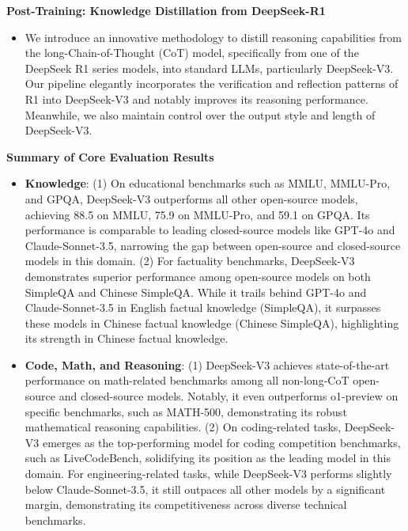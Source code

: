 \documentclass[11pt, a4paper, logo, copyright, nonumbering]{deepseek}
\newcommand{\dsviii}{DeepSeek-V3}
\begin{document}
\begin{CJK*}{UTF8}{gbsn}
\noindent
\textbf{Post-Training: Knowledge Distillation from DeepSeek-R1}
\begin{itemize}[topsep=0pt]
    \item 
    We introduce an innovative methodology to distill reasoning capabilities from the long-Chain-of-Thought (CoT) model, specifically from one of the DeepSeek R1 series models, into standard LLMs, particularly \dsviii{}.
    Our pipeline elegantly incorporates the verification and reflection patterns of R1 into \dsviii{} and notably improves its reasoning performance.
    Meanwhile, we also maintain control over the output style and length of \dsviii{}. 
\end{itemize}
\noindent
\textbf{Summary of Core Evaluation Results}
\begin{itemize}[topsep=0pt]
    \item \textbf{Knowledge}:
    (1) 
    On educational benchmarks such as MMLU, MMLU-Pro, and GPQA, \dsviii{} outperforms all other open-source models, achieving 88.5 on MMLU, 75.9 on MMLU-Pro, and 59.1 on GPQA.
    Its performance is comparable to leading closed-source models like GPT-4o and Claude-Sonnet-3.5, narrowing the gap between open-source and closed-source models in this domain.
    (2)
    For factuality benchmarks, \dsviii{} demonstrates superior performance among open-source models on both SimpleQA and Chinese SimpleQA. 
    While it trails behind GPT-4o and Claude-Sonnet-3.5 in English factual knowledge (SimpleQA), it surpasses these models in Chinese factual knowledge (Chinese SimpleQA), highlighting its strength in Chinese factual knowledge.
    
    \item \textbf{Code, Math, and Reasoning}: 
    (1)
    \dsviii{} achieves state-of-the-art performance on math-related benchmarks among all non-long-CoT open-source and closed-source models. 
    Notably, it even outperforms o1-preview on specific benchmarks, such as MATH-500, demonstrating its robust mathematical reasoning capabilities. 
    (2)
    On coding-related tasks, \dsviii{} emerges as the top-performing model for coding competition benchmarks, such as LiveCodeBench, solidifying its position as the leading model in this domain. 
    For engineering-related tasks, while \dsviii{} performs slightly below Claude-Sonnet-3.5, it still outpaces all other models by a significant margin, demonstrating its competitiveness across diverse technical benchmarks.
\end{itemize}



\end{CJK*}
\end{document}
